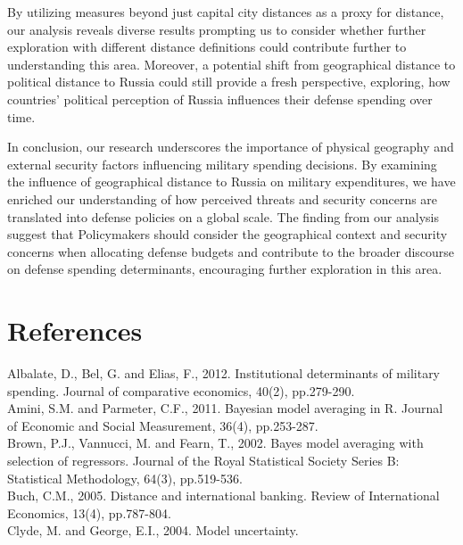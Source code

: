 \documentclass[12pt,a4paper]{article}
\begin{document}
By utilizing measures beyond just capital city distances as a proxy for distance, our analysis reveals diverse results prompting us to consider whether further exploration with different distance definitions could contribute further to understanding this area. Moreover, a potential shift from geographical distance to political distance to Russia could still provide a fresh perspective, exploring, how countries’ political perception of Russia influences their defense spending over time.

In conclusion, our research underscores the importance of physical geography and external security factors influencing military spending decisions. By examining the influence of geographical distance to Russia on military expenditures, we have enriched our understanding of how perceived threats and security concerns are translated into defense policies on a global scale. The finding from our analysis suggest that Policymakers should consider the geographical context and security concerns when allocating defense budgets and contribute to the broader discourse on defense spending determinants, encouraging further exploration in this area.  




\clearpage


\section{References}
Albalate, D., Bel, G. and Elias, F., 2012. Institutional determinants of military spending. Journal of comparative economics, 40(2), pp.279-290. \\

Amini, S.M. and Parmeter, C.F., 2011. Bayesian model averaging in R. Journal of Economic and Social Measurement, 36(4), pp.253-287. \\

Brown, P.J., Vannucci, M. and Fearn, T., 2002. Bayes model averaging with selection of regressors. Journal of the Royal Statistical Society Series B: Statistical Methodology, 64(3), pp.519-536.\\

Buch, C.M., 2005. Distance and international banking. Review of International Economics, 13(4), pp.787-804. \\

Clyde, M. and George, E.I., 2004. Model uncertainty.\\
\end{document}
